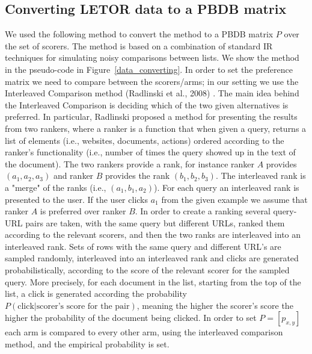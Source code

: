 \documentclass[MSc,beforeExam]{iitcsthesis}
\begin{document}
\subsection{Converting LETOR data to a PBDB matrix}
We used the following method to convert the method to a PBDB matrix $P$ over the set of scorers.
The method is based on a combination of standard IR techniques for simulating noisy comparisons between lists. We show the method in the pseudo-code in Figure~\ref{data_converting}.
In order to set the preference matrix we need to compare between the scorers/arms; in our setting we use the Interleaved Comparison method (Radlinski et al., 2008) \cite{radlinski2008learning}.
The main idea behind the Interleaved Comparison is deciding which of the two given alternatives is preferred.
In particular, Radlinski proposed a method for presenting the results from two rankers, where a ranker is a function that when given a query, returns a list of elements (i.e., websites, documents, actions) ordered according to the ranker's functionality (i.e., number of times the query showed up in the text of the document).
The two rankers provide a rank, for instance ranker $A$ provides $(a_1,a_2,a_3)$ and ranker $B$ provides the rank $(b_1,b_2,b_3)$.
The interleaved rank is a "merge" of the ranks (i.e., $(a_1,b_1,a_2)$).
For each query an interleaved rank is presented to the user. If the user clicks $a_1$ from the given example we assume that ranker $A$ is preferred over ranker $B$.
In order to create a ranking several query-URL pairs are taken, with the same query but different URLs, ranked them according to the relevant scorers, and then the two ranks are interleaved into an interleaved rank.
Sets of rows with the same query and different URL's are sampled randomly, interleaved into an interleaved rank and clicks are generated probabilistically, according to the score of the relevant scorer for the sampled query. More precisely, for each document in the list, starting from the top of the list, a click is generated according the probability $P(\text{click}|\text{scorer's score for the pair})$, meaning the higher the scorer's score the higher the probability of the document being clicked.
In order to set $P = [p_{x,y}]$ each arm is compared to every other arm, using the interleaved comparison method, and the empirical probability is set.
\end{document}
